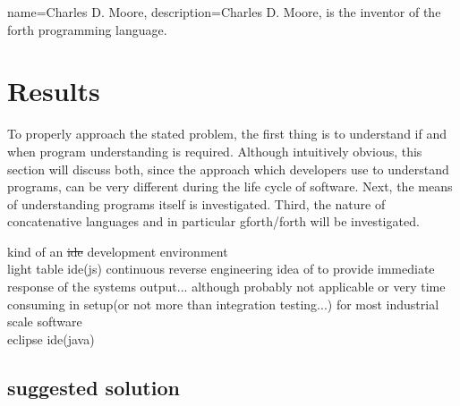 {
  name={Charles D. Moore},
  description={Charles D. Moore, is the inventor of the forth programming language.}
}

\chapter{Results}

To properly approach the stated problem, the first thing is to understand if and when program understanding is required. Although intuitively obvious, this section will discuss both, since the approach which developers use to understand programs, can be very different during the life cycle of software. Next, the means of understanding programs itself is investigated. Third, the nature of concatenative languages and in particular gforth/forth will be investigated.



kind of an \sout{ide} development environment\\
light table ide(js) continuous reverse engineering idea of \cite{Muller:2000:RER:336512.336526} to provide immediate response of the systems output... although probably not applicable or very time consuming in setup(or not more than integration testing...) for most industrial scale software\\
eclipse ide(java)

\section{suggested solution}

